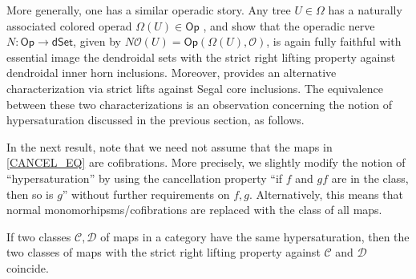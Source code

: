 \documentclass[a4paper,10pt
 ,draft
]{article}%
\begin{document}
More generally, 
one has a similar operadic story. Any tree $U \in \Omega$ has a naturally associated colored operad 
$\Omega(U) \in \mathsf{Op}$ \cite[\S 3]{MW07}, and
\cite[Prop. 5.3 and Thm. 6.1]{MW09} show that the operadic nerve
$N \colon \mathsf{Op} \to \mathsf{dSet}$, 
given by $N\mathcal{O} (U) = \mathsf{Op}(\Omega(U), \mathcal {O})$,
is again fully faithful
with essential image the dendroidal sets with the strict right lifting property against dendroidal inner horn inclusions.
Moreover, \cite[Cor. 2.6]{CM13a} provides an alternative characterization via strict lifts against Segal core inclusions. The equivalence between these two characterizations is an observation concerning the notion of hypersaturation discussed in the previous section, as follows.


In the next result, note that we need not assume that the maps in
\eqref{CANCEL_EQ} are cofibrations. More precisely,
we slightly modify the notion of ``hypersaturation'' by using the cancellation property 
``if $f$ and $gf$ are in the class, then so is $g$'' without further  requirements on $f,g$. Alternatively, this means that normal monomorhipsms/cofibrations are replaced with the class of all maps.

\begin{proposition}\label{HYPERLP PROP}
      If two classes $\mathcal{C},\mathcal{D}$
      of maps in a category
      have the same hypersaturation, then
      the two classes of maps with the strict right lifting property against $\mathcal C$ and $\mathcal D$ coincide.
\end{proposition}
\end{document}
